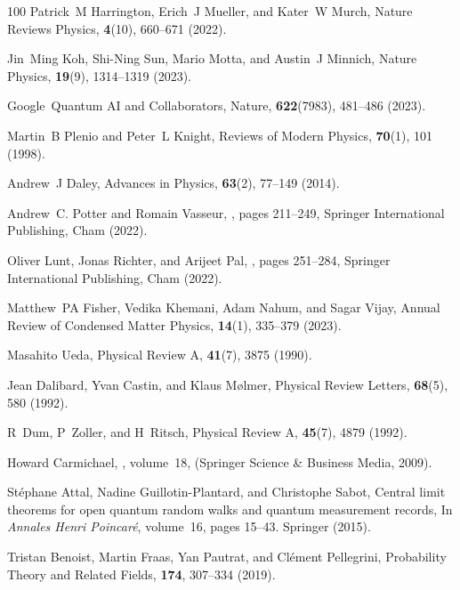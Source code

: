 \documentclass[preprint,pteplogo]{ptephy_v2}%
\numberwithin{equation}{section}
\theoremstyle{definition}
\begin{document}
\begin{thebibliography}{100}
Patrick~M Harrington, Erich~J Mueller, and Kater~W Murch, Nature Reviews Physics, {\bf 4}(10), 660--671 (2022).

Jin~Ming Koh, Shi-Ning Sun, Mario Motta, and Austin~J Minnich, Nature Physics, {\bf 19}(9), 1314--1319 (2023).

Google~Quantum AI and Collaborators, Nature, {\bf 622}(7983), 481--486 (2023).

Martin~B Plenio and Peter~L Knight, Reviews of Modern Physics, {\bf 70}(1), 101 (1998).

Andrew~J Daley, Advances in Physics, {\bf 63}(2), 77--149 (2014).

Andrew~C. Potter and Romain Vasseur,
, pages 211--249,
\newblock Springer International Publishing, Cham (2022).

Oliver Lunt, Jonas Richter, and Arijeet Pal,
, pages 251--284,
\newblock Springer International Publishing, Cham (2022).

Matthew~PA Fisher, Vedika Khemani, Adam Nahum, and Sagar Vijay, Annual Review of Condensed Matter Physics, {\bf 14}(1), 335--379 (2023).

Masahito Ueda, Physical Review A, {\bf 41}(7), 3875 (1990).

Jean Dalibard, Yvan Castin, and Klaus M{\o}lmer, Physical Review Letters, {\bf 68}(5), 580 (1992).

R~Dum, P~Zoller, and H~Ritsch, Physical Review A, {\bf 45}(7), 4879 (1992).

Howard Carmichael,
, volume~18,
\newblock  (Springer Science \& Business Media, 2009).

St{\'e}phane Attal, Nadine Guillotin-Plantard, and Christophe Sabot,
\newblock Central limit theorems for open quantum random walks and quantum measurement records,
\newblock In {\em Annales Henri Poincar{\'e}}, volume~16, pages 15--43. Springer (2015).

Tristan Benoist, Martin Fraas, Yan Pautrat, and Cl{\'e}ment Pellegrini, Probability Theory and Related Fields, {\bf 174}, 307--334 (2019).


\end{thebibliography}
\end{document}
